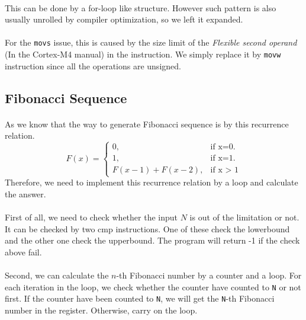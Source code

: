\paragraph{}
This can be done by a for-loop like structure. However such pattern is also usually unrolled by compiler optimization,
so we left it expanded.
\paragraph{}
For the \texttt{movs} issue, this is caused by the size limit of the \textit{Flexible second operand}
(In the Cortex-M4 manual) in the instruction.
We simply replace it by \texttt{movw} instruction since all the operations are unsigned.


\subsection{Fibonacci Sequence}
\paragraph{}
As we know that the way to generate Fibonacci sequence is by this recurrence relation.
\begin{equation}
  F(x)=\begin{cases}
    0, & \text{if x=0}.\\
    1, & \text{if x=1}.\\
    F(x - 1) + F(x - 2), & \text{if x > 1}
  \end{cases}
\end{equation}
Therefore, we need to implement this recurrence relation by a loop and calculate the answer.
\paragraph{}
First of all, we need to check whether the input $N$ is out of the limitation or not. It can be checked by two cmp instructions. One of these check the lowerbound and the other one check the upperbound. The program will return -1 if the check above fail.
\paragraph{}
Second, we can calculate the $n$-th Fibonacci number by a counter and a loop. For each iteration in the loop, we check whether the counter have counted to \texttt{N} or not first. If the counter have been counted to \texttt{N}, we will get the \texttt{N}-th Fibonacci number in the register. Otherwise, carry on the loop.
